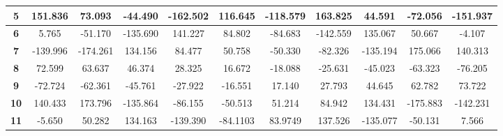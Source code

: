 \documentclass[conference]{IEEEtran}
\begin{document}
\begin{table*}[!ht]
\begin{center}
{\begin{tabular}{|l|l|l|l|l|l|l|l|l|l|l|}
\hline
\multicolumn{1}{|c|}{\textbf{5}} & \multicolumn{1}{c|}{151.836} & \multicolumn{1}{c|}{73.093} & \multicolumn{1}{c|}{-44.490} & \multicolumn{1}{c|}{-162.502} & \multicolumn{1}{c|}{116.645} & \multicolumn{1}{c|}{-118.579} & \multicolumn{1}{c|}{163.825} & \multicolumn{1}{c|}{44.591} & \multicolumn{1}{c|}{-72.056} & \multicolumn{1}{c|}{-151.937} \\ 
\hline
\multicolumn{1}{|c|}{\textbf{6}} & \multicolumn{1}{c|}{5.765} & \multicolumn{1}{c|}{-51.170} & \multicolumn{1}{c|}{-135.690} & \multicolumn{1}{c|}{141.227} & \multicolumn{1}{c|}{84.802} & \multicolumn{1}{c|}{-84.683} & \multicolumn{1}{c|}{-142.559} & \multicolumn{1}{c|}{135.067} & \multicolumn{1}{c|}{50.667} & \multicolumn{1}{c|}{-4.107} \\ 
\hline
\multicolumn{1}{|c|}{\textbf{7}} & \multicolumn{1}{c|}{-139.996} & \multicolumn{1}{c|}{-174.261} & \multicolumn{1}{c|}{134.156} & \multicolumn{1}{c|}{84.477} & \multicolumn{1}{c|}{50.758} & \multicolumn{1}{c|}{-50.330} & \multicolumn{1}{c|}{-82.326} & \multicolumn{1}{c|}{-135.194} & \multicolumn{1}{c|}{175.066} & \multicolumn{1}{c|}{140.313} \\ 
\hline
\multicolumn{1}{|c|}{\textbf{8}} & \multicolumn{1}{c|}{72.599} & \multicolumn{1}{c|}{63.637} & \multicolumn{1}{c|}{46.374} & \multicolumn{1}{c|}{28.325} & \multicolumn{1}{c|}{16.672} & \multicolumn{1}{c|}{-18.088} & \multicolumn{1}{c|}{-25.631} & \multicolumn{1}{c|}{-45.023} & \multicolumn{1}{c|}{-63.323} & \multicolumn{1}{c|}{-76.205} \\ 
\hline
\multicolumn{1}{|c|}{\textbf{9}} & \multicolumn{1}{c|}{-72.724} & \multicolumn{1}{c|}{-62.361} & \multicolumn{1}{c|}{-45.761} & \multicolumn{1}{c|}{-27.922} & \multicolumn{1}{c|}{-16.551} & \multicolumn{1}{c|}{17.140} & \multicolumn{1}{c|}{27.793} & \multicolumn{1}{c|}{44.645} & \multicolumn{1}{c|}{62.782} & \multicolumn{1}{c|}{73.722} \\ 
\hline
\multicolumn{1}{|c|}{\textbf{10}} & \multicolumn{1}{c|}{140.433} & \multicolumn{1}{c|}{173.796} & \multicolumn{1}{c|}{-135.864} & \multicolumn{1}{c|}{-86.155} & \multicolumn{1}{c|}{-50.513} & \multicolumn{1}{c|}{51.214} & \multicolumn{1}{c|}{84.942} & \multicolumn{1}{c|}{134.431} & \multicolumn{1}{c|}{-175.883} & \multicolumn{1}{c|}{-142.231} \\ 
\hline
\multicolumn{1}{|c|}{\textbf{11}} & \multicolumn{1}{c|}{-5.650} & \multicolumn{1}{c|}{50.282} & \multicolumn{1}{c|}{ 134.163} & \multicolumn{1}{c|}{-139.390} & \multicolumn{1}{c|}{-84.1103} & \multicolumn{1}{c|}{83.9749} & \multicolumn{1}{c|}{137.526} & \multicolumn{1}{c|}{-135.077} & \multicolumn{1}{c|}{-50.131} & \multicolumn{1}{c|}{7.566} \\ 

\end{tabular}}
\end{center}
\end{table*}
\end{document}
